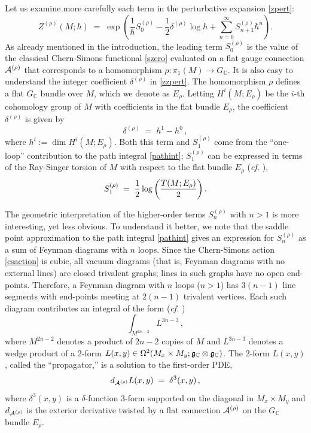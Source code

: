 \documentclass[hyper]{JHEP3}
\def\CA {{\cal A}}
\newcommand{\C}{{\mathbb{C}}}
\newcommand\be{\begin{equation}}
\newcommand\ee{\end{equation}}
\def\={\;=\;}
\begin{document}
Let us examine more carefully each term in the perturbative expansion \eqref{zpert}:
\be
Z^{(\rho)} (M;\hbar)
\= \exp\left( \frac{1}{\hbar} S_0^{(\rho)} - \frac{1}{2}\delta^{(\rho)} \log \hbar
+ \sum_{n=0}^\infty S_{n+1}^{(\rho)} \hbar^n \right).
\label{zzpert}
\ee
As already mentioned in the introduction, the leading term $S_0^{(\rho)}$
is the value of the classical Chern-Simons functional \eqref{szero} evaluated
on a flat gauge connection $\CA^{(\rho)}$ that corresponds to a homomorphism
$\rho : \pi_1 (M) \to G_{\C}$.
It is also easy to understand the integer coefficient $\delta^{(\rho)}$ in \eqref{zzpert}.
The homomorphism $\rho$ defines a flat $G_{\C}$ bundle over $M$,
which we denote as $E_{\rho}$.
Letting $H^i (M;E_{\rho})$ be the $i$-th cohomology group of $M$
with coefficients in the flat bundle $E_{\rho}$, the coefficient $\delta^{(\rho)}$ is given by
\be
\delta^{(\rho)} \= h^1 - h^0\,,
\label{dhh}
\ee
where $h^i := \dim H^i (M;E_{\rho})$.
Both this term and $S_1^{(\rho)}$ come from the ``one-loop'' contribution
to the path integral \eqref{pathint}; $S_1^{(\rho)}$ can be expressed in terms
of the Ray-Singer torsion of $M$ with respect to the flat
bundle $E_{\rho}$ ({\it cf.} \cite{witten-1989,barnatan-1991w,gukov-2006}),
\be
S_1^{(\rho)} \= \frac{1}{2} \log \left( {T (M;E_{\rho}) \over 2} \right).
\label{sonetorsion}
\ee

The geometric interpretation of the higher-order terms $S_n^{(\rho)}$
with $n>1$ is more interesting, yet less obvious.
To understand it better, we note that the saddle point approximation
to the path integral \eqref{pathint} gives an expression for $S_n^{(\rho)}$
as a sum of Feynman diagrams with $n$ loops.
Since the Chern-Simons action \eqref{csaction} is cubic, all vacuum diagrams
(that is, Feynman diagrams with no external lines) are closed trivalent graphs;
lines in such graphs have no open end-points.
Therefore, a Feynman diagram with $n$ loops ($n>1$) has
$3(n-1)$ line segments with end-points meeting at $2(n-1)$ trivalent vertices.
Each such diagram contributes an integral of the form ({\it cf.} \cite{as-1992})
\be
\int_{M^{2n-2}} L^{3n-3}\,,
\label{snint}
\ee
where $M^{2n-2}$ denotes a product of $2n-2$ copies of $M$
and $L^{3n-3}$ denotes a wedge product of
a 2-form $L (x,y) \in \Omega^2 (M_x \times M_y; \frak g_{\C} \otimes \frak g_{\C})$.
The 2-form $L(x,y)$, called the ``propagator,''
is a solution to the first-order PDE,
\be
d_{\CA^{(\rho)}} L (x,y) \= \delta^3 (x,y)\,,
\label{propag}
\ee
where $\delta^3 (x,y)$ is a $\delta$-function 3-form supported
on the diagonal in $M_x \times M_y$ and $d_{\CA^{(\rho)}}$
is the exterior derivative twisted by a flat connection $\CA^{(\rho)}$
on the $G_{\C}$ bundle $E_{\rho}$.
\end{document}
